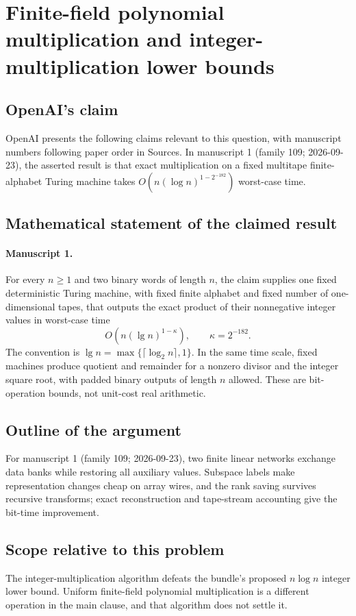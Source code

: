 \documentclass[11pt]{article}
\begin{document}
\section*{Finite-field polynomial multiplication and integer-multiplication lower bounds}

\subsection{OpenAI's claim}
OpenAI presents the following claims relevant to this question, with manuscript numbers following paper order in Sources. In manuscript 1 (family 109; 2026-09-23), the asserted result is that exact multiplication on a fixed multitape finite-alphabet Turing machine takes $O(n(\log n)^{1-2^{-182}})$ worst-case time.

\subsection{Mathematical statement of the claimed result}
\paragraph{Manuscript 1.}
For every $n\ge1$ and two binary words of length $n$, the claim supplies one fixed deterministic Turing machine, with fixed finite alphabet and fixed number of one-dimensional tapes, that outputs the exact product of their nonnegative integer values in worst-case time
\[
 O(n(\lg n)^{1-\kappa}),\qquad\kappa=2^{-182}.
\]
The convention is $\lg n=\max\{\lceil\log_2n\rceil,1\}$. In the same time scale, fixed machines produce quotient and remainder for a nonzero divisor and the integer square root, with padded binary outputs of length $n$ allowed. These are bit-operation bounds, not unit-cost real arithmetic.

\subsection{Outline of the argument}
For manuscript 1 (family 109; 2026-09-23), two finite linear networks exchange data banks while restoring all auxiliary values. Subspace labels make representation changes cheap on array wires, and the rank saving survives recursive transforms; exact reconstruction and tape-stream accounting give the bit-time improvement.

\subsection{Scope relative to this problem}
The integer-multiplication algorithm defeats the bundle's proposed $n\log n$ integer lower bound. Uniform finite-field polynomial multiplication is a different operation in the main clause, and that algorithm does not settle it.
\end{document}
